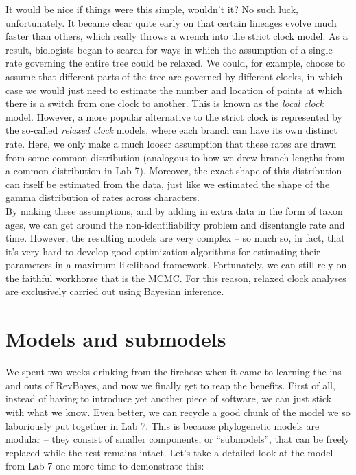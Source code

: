 \documentclass[12pt]{article}
\begin{document}
\noindent It would be nice if things were this simple, wouldn't it? No such luck, unfortunately. It became clear quite early on that certain lineages evolve much faster than others, which really throws a wrench into the strict clock model. As a result, biologists began to search for ways in which the assumption of a single rate governing the entire tree could be relaxed. We could, for example, choose to assume that different parts of the tree are governed by different clocks, in which case we would just need to estimate the number and location of points at which there is a switch from one clock to another. This is known as the \textit{local clock} model. However, a more popular alternative to the strict clock is represented by the so-called \textit{relaxed clock} models, where each branch can have its own distinct rate. Here, we only make a much looser assumption that these rates are drawn from some common distribution (analogous to how we drew branch lengths from a common distribution in Lab 7). Moreover, the exact shape of this distribution can itself be estimated from the data, just like we estimated the shape of the gamma distribution of rates across characters. \\

\noindent By making these assumptions, and by adding in extra data in the form of taxon ages, we can get around the non-identifiability problem and disentangle rate and time. However, the resulting models are very complex -- so much so, in fact, that it's very hard to develop good optimization algorithms for estimating their parameters in a maximum-likelihood framework. Fortunately, we can still rely on the faithful workhorse that is the MCMC. For this reason, relaxed clock analyses are exclusively carried out using Bayesian inference.

\section*{Models and submodels}

We spent two weeks drinking from the firehose when it came to learning the ins and outs of RevBayes, and now we finally get to reap the benefits. First of all, instead of having to introduce yet another piece of software, we can just stick with what we know. Even better, we can recycle a good chunk of the model we so laboriously put together in Lab 7. This is because phylogenetic models are modular -- they consist of smaller components, or ``submodels'', that can be freely replaced while the rest remains intact. Let's take a detailed look at the model from Lab 7 one more time to demonstrate this: \\[-0.75ex]
\end{document}
